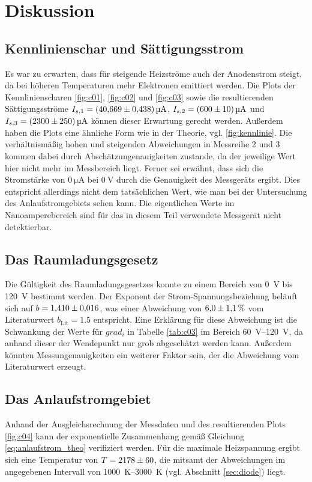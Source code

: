 \section{Diskussion}

\subsection{Kennlinienschar und Sättigungsstrom}
Es war zu erwarten, dass für steigende Heizströme auch der Anodenstrom steigt, da bei höheren Temperaturen mehr
Elektronen emittiert werden.
Die Plots der Kennlinienscharen \ref{fig:c01}, \ref{fig:c02} und \ref{fig:c03} sowie die resultierenden 
Sättigungsströme $I_{s,1} = \qty{40.669 \pm 0.438}{\micro\ampere}$, $I_{s,2} = \qty{600 \pm 10}{\micro\ampere}$ und 
$I_{s,3}= \qty{2300 \pm 250}{\micro\ampere}$ können dieser Erwartung gerecht werden.
Außerdem haben die Plots eine ähnliche Form wie in der Theorie, vgl. \ref{fig:kennlinie}.
Die verhältnismäßig hohen und steigenden Abweichungen in Messreihe 2 und 3 kommen dabei durch Abschätzungenauigkeiten zustande,
da der jeweilige Wert hier nicht mehr im Messbereich liegt.
Ferner sei erwähnt, dass sich die Stromstärke von $\qty[]{0}{\micro\ampere}$ bei $\qty[]{0}{\volt}$ durch die Genauigkeit des 
Messgeräts ergibt.
Dies entspricht allerdings nicht dem tatsächlichen Wert, wie man bei der Untersuchung des Anlaufstromgebiets sehen kann.
Die eigentlichen Werte im Nanoamperebereich sind für das in diesem Teil verwendete Messgerät nicht detektierbar.




\subsection{Das Raumladungsgesetz}
Die Gültigkeit des Raumladungsgesetzes konnte zu einem Bereich von \qty[]{0}{\volt} bis \qty{120}{\volt} bestimmt werden.
Der Exponent der Strom-Spannungsbeziehung beläuft sich auf $b = \num{1.410 \pm 0.016}$, was einer Abweichung von 
$\num{6.0+-1.1}\, \%$ vom Literaturwert $b_\text{Lit} = \num[]{1.5}$ entspricht.
Eine Erklärung für diese Abweichung ist die Schwankung der Werte für $grad_i$ in Tabelle \ref{tab:c03} im Bereich \qtyrange[]{60}{120}{\volt},
da anhand dieser der Wendepunkt nur grob abgeschätzt werden kann.
Außerdem könnten Messungenauigkeiten ein weiterer Faktor sein, der die Abweichung vom Literaturwert erzeugt.



\subsection{Das Anlaufstromgebiet}
Anhand der Ausgleichsrechnung der Messdaten und des resultierenden Plots \ref{fig:c04} kann der exponentielle Zusammenhang gemäß 
Gleichung \eqref{eq:anlaufstrom_theo} verifiziert werden.
Für die maximale Heizspannung ergibt sich eine Temperatur von $T = \num[]{2178 \pm  60}$, die
mitsamt der Abweichungen im angegebenen Intervall von \qtyrange[]{1000}{3000}{\kelvin}
(vgl. Abschnitt \ref{sec:diode}) liegt.

